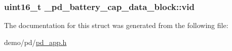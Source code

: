 \hypertarget{struct__pd__battery__cap__data__block_a8b906175f5651c5041c707699ebd9388}{
\subsubsection[{vid}]{\setlength{\rightskip}{0pt plus 5cm}uint16\-\_\-t \-\_\-pd\-\_\-battery\-\_\-cap\-\_\-data\-\_\-block\-::vid}}\label{struct__pd__battery__cap__data__block_a8b906175f5651c5041c707699ebd9388}


The documentation for this struct was generated from the following file\-:\begin{DoxyCompactItemize}
\item 
demo/pd/\hyperlink{pd__app_8h}{pd\-\_\-app.\-h}\end{DoxyCompactItemize}
